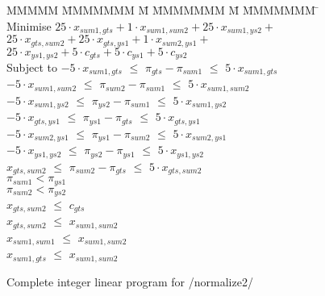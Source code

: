 \begin{figure}
\begin{tabbing}
MMMMM   \= MMMMMMM \= M \= MMMMMMM \= M \= MMMMMMM \= \kill
Minimise   \> $25 \cdot x_{sum1, gts} + 1  \cdot x_{sum1,sum2} + 25 \cdot x_{sum1, ys2} +$ \\
           \> $25 \cdot x_{gts, sum2} + 25 \cdot x_{gts, ys1} + 1 \cdot x_{sum2, ys1} +$ \\
           \> $25 \cdot x_{ys1, ys2}  + 5  \cdot c_{gts} + 5 \cdot c_{ys1} + 5 \cdot c_{ys2} $
\\[0.5ex]
Subject to 
    \> $-5 \cdot x_{sum1, gts}$  \> $\le$ \> $\pi_{gts} - \pi_{sum1}$  \> $\le$ \> $5 \cdot x_{sum1, gts}$  \\
    \> $-5 \cdot x_{sum1, sum2}$ \> $\le$ \> $\pi_{sum2} - \pi_{sum1}$ \> $\le$ \> $5 \cdot x_{sum1, sum2}$ \\
    \> $-5 \cdot x_{sum1, ys2 }$ \> $\le$ \> $\pi_{ys2 } - \pi_{sum1}$ \> $\le$ \> $5 \cdot x_{sum1, ys2 }$ \\
    \> $-5 \cdot x_{gts,  ys1 }$ \> $\le$ \> $\pi_{ys1 } - \pi_{gts }$ \> $\le$ \> $5 \cdot x_{gts, ys1  }$ \\
    \> $-5 \cdot x_{sum2, ys1 }$ \> $\le$ \> $\pi_{ys1 } - \pi_{sum2}$ \> $\le$ \> $5 \cdot x_{sum2, ys1 }$ \\
    \> $-5 \cdot x_{ys1, ys2  }$ \> $\le$ \> $\pi_{ys2 } - \pi_{ys1 }$ \> $\le$ \> $5 \cdot x_{ys1, ys2  }$ 
\\[0.5ex]
    \> $   x_{gts, sum2 }$ \> $\le$ \> $\pi_{sum2} - \pi_{gts }$ \> $\le$ \> $5 \cdot x_{gts, sum2 }$ 
\\[0.5ex]
    \>                     \>       \> $\pi_{sum1} < \pi_{ys1}$ \\
    \>                     \>       \> $\pi_{sum2} < \pi_{ys2}$
\\[0.5ex]
    \> $ x_{gts,sum2} $    \> $\le$ \> $c_{gts}$
\\[0.5ex]
    \> $x_{gts, sum2}$     \> $\le$ \> $x_{sum1, sum2}$ \\
    \> $x_{sum1,sum1}$     \> $\le$ \> $x_{sum1, sum2}$ \\
    \> $x_{sum1, gts}$     \> $\le$ \> $x_{sum1, sum2}$
\end{tabbing}
\caption{Complete integer linear program for \Hs/normalize2/}
\label{fig:clustering:normalize2-ilp}
\end{figure}

